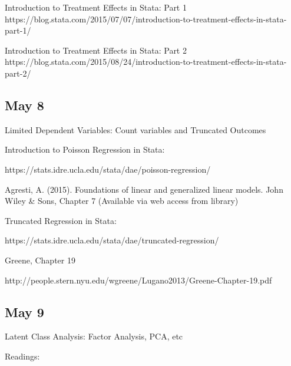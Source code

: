 \documentclass[10pt]{article}
\begin{document}
\begin{description}


\item {}

\item {}

\item {}

\item {}

\item {}


Introduction to Treatment Effects in Stata: Part 1
https://blog.stata.com/2015/07/07/introduction-to-treatment-effects-in-stata-part-1/

Introduction to Treatment Effects in Stata: Part 2
https://blog.stata.com/2015/08/24/introduction-to-treatment-effects-in-stata-part-2/



\end{description}

\subsection{May 8}

Limited Dependent Variables: Count variables and Truncated Outcomes

Introduction to Poisson Regression in Stata:

https://stats.idre.ucla.edu/stata/dae/poisson-regression/

Agresti, A. (2015). Foundations of linear and generalized linear models. John Wiley \& Sons, Chapter 7
(Available via web access from library)

Truncated Regression in Stata:

https://stats.idre.ucla.edu/stata/dae/truncated-regression/

Greene, Chapter 19

http://people.stern.nyu.edu/wgreene/Lugano2013/Greene-Chapter-19.pdf




\subsection{May 9}


Latent Class Analysis: Factor Analysis, PCA, etc

Readings:
\end{document}
